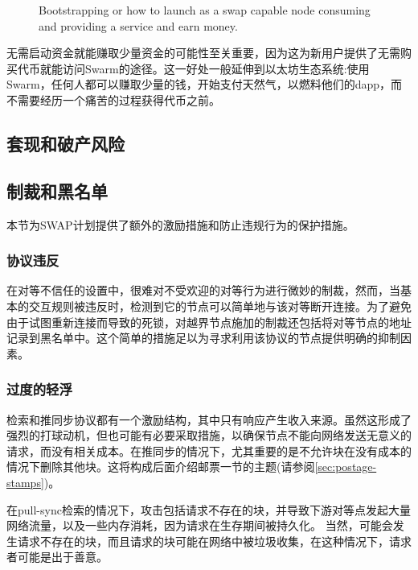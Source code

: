 \begin{figure}[htbp]
\centering

\caption[Zero cash entry \statusorange]{Bootstrapping or how to launch as a swap capable node consuming and providing a
service and earn money.}
\label{fig:zero-cash-entry}
\end{figure}

无需启动资金就能赚取少量资金的可能性至关重要，因为这为新用户提供了无需购买代币就能访问Swarm的途径。这一好处一般延伸到以太坊生态系统:使用Swarm，任何人都可以赚取少量的钱，开始支付天然气，以燃料他们的dapp，而不需要经历一个痛苦的过程获得代币之前。 


\subsection{套现和破产风险}



\subsection{制裁和黑名单\statusgreen}\label{sec:sanctions}
\red{}

本节为SWAP计划提供了额外的激励措施和防止违规行为的保护措施。 

\subsubsection{协议违反}

在对等不信任的设置中，很难对不受欢迎的对等行为进行微妙的制裁，然而，当基本的交互规则被违反时，检测到它的节点可以简单地与该对等断开连接。为了避免由于试图重新连接而导致的死锁，对越界节点施加的制裁还包括将对等节点的地址记录到黑名单中。这个简单的措施足以为寻求利用该协议的节点提供明确的抑制因素。 

\subsubsection{过度的轻浮}

检索和推同步协议都有一个激励结构，其中只有响应产生收入来源。虽然这形成了强烈的打球动机，但也可能有必要采取措施，以确保节点不能向网络发送无意义的请求，而没有相关成本。在推同步的情况下，尤其重要的是不允许块在没有成本的情况下删除其他块。这将构成后面介绍邮票一节的主题(请参阅\ref{sec:postage-stamps})。

在pull-sync检索的情况下，攻击包括请求不存在的块，并导致下游对等点发起大量网络流量，以及一些内存消耗，因为请求在生存期间被持久化。
当然，可能会发生请求不存在的块，而且请求的块可能在网络中被垃圾收集，在这种情况下，请求者可能是出于善意。 

